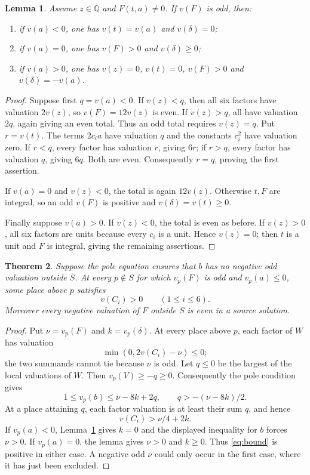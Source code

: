 \documentclass[11pt,a4paper]{article}
\newtheorem{theorem}{Theorem}[section]
\newtheorem{lemma}[theorem]{Lemma}
\newcommand{\Q}{\mathbb Q}\newcommand{\Z}{\mathbb Z}
\begin{document}
\begin{lemma}\label{lem:valuation}
Assume $z\in\Q$ and $F(t,a)\ne0$. If $v(F)$ is odd, then:
\begin{enumerate}
\item if $v(a)<0$, one has $v(t)=v(a)$ and $v(\delta)=0$;
\item if $v(a)=0$, one has $v(F)>0$ and $v(\delta)\ge0$;
\item if $v(a)>0$, one has $v(z)=0$, $v(t)=0$, $v(F)>0$
      and $v(\delta)=-v(a)$.
\end{enumerate}
\end{lemma}
\begin{proof}
Suppose first $q=v(a)<0$. If $v(z)<q$, then all six factors
have valuation $2v(z)$, so $v(F)=12v(z)$ is even. If $v(z)>q$,
all have valuation $2q$, again giving an even total. Thus an odd
total requires $v(z)=q$. Put $r=v(t)$. The terms $2c_i a$ have
valuation $q$ and the constants $c_i^2$ have valuation zero.
If $r<q$, every factor has valuation $r$, giving $6r$; if $r>q$,
every factor has valuation $q$, giving $6q$. Both are even.
Consequently $r=q$, proving the first assertion.

If $v(a)=0$ and $v(z)<0$, the total is again $12v(z)$.
Otherwise $t,F$ are integral, so an odd $v(F)$ is positive and
$v(\delta)=v(t)\ge0$.

Finally suppose $v(a)>0$. If $v(z)<0$, the total is even as
before. If $v(z)>0$, all six factors are units because every $c_i$
is a unit. Hence $v(z)=0$; then $t$ is a unit and $F$ is integral,
giving the remaining assertions.
\end{proof}

\begin{theorem}\label{thm:extraction}
Suppose the pole equation ensures that $b$ has no negative odd
valuation outside $S$. At every $p\notin S$ for which $v_p(F)$ is
odd and $v_p(a)\le0$, some place above $p$ satisfies
\[
                        v(C_i)>0\qquad(1\le i\le6).
\]
Moreover every negative valuation of $F$ outside $S$ is even in a
source solution.
\end{theorem}
\begin{proof}
Put $\nu=v_p(F)$ and $k=v_p(\delta)$. At every place above $p$,
each factor of $W$ has valuation
\[
                  \min(0,2v(C_i)-\nu)\le0;
\]
the two summands cannot tie because $\nu$ is odd. Let $q\le0$ be
the largest of the local valuations of $W$. Then
$v_p(V)\ge-q\ge0$. Consequently the pole condition gives
\[
 1\le v_p(b)\le\nu-8k+2q,
 \qquad q>-(\nu-8k)/2.
\]
At a place attaining $q$, each factor valuation is at least their
sum $q$, and hence
\begin{equation}\label{eq:bound}
                         v(C_i)>\nu/4+2k.
\end{equation}
If $v_p(a)<0$, Lemma~\ref{lem:valuation} gives $k=0$ and
the displayed inequality for $b$ forces $\nu>0$. If $v_p(a)=0$,
the lemma gives $\nu>0$ and $k\ge0$. Thus \eqref{eq:bound} is
positive in either case. A negative odd $\nu$ could only occur
in the first case, where it has just been excluded.
\end{proof}
\end{document}
